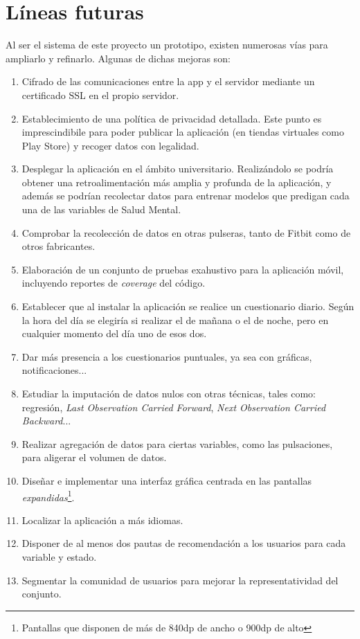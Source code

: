 \chapter{Líneas futuras}
\label{chapter:lineas}



Al ser el sistema de este proyecto un prototipo, existen numerosas vías para ampliarlo y refinarlo. Algunas de dichas
mejoras son:

\begin{enumerate}
    \item Cifrado de las comunicaciones entre la app y el servidor mediante un certificado SSL en el propio servidor.
    \item Establecimiento de una política de privacidad detallada. Este punto es imprescindibile para poder publicar la aplicación (en tiendas virtuales como Play Store) y recoger datos con legalidad.
    \item Desplegar la aplicación en el ámbito universitario. Realizándolo se podría obtener una retroalimentación más
    amplia y profunda de la aplicación, y además se podrían recolectar datos para entrenar
    modelos que predigan cada una de las variables de Salud Mental.
    \item Comprobar la recolección de datos en otras pulseras, tanto de Fitbit como de otros fabricantes.
    \item Elaboración de un conjunto de pruebas exahustivo para la aplicación móvil, incluyendo reportes de 
    \textit{coverage} del código.
    \item Establecer que al instalar la aplicación se realice un cuestionario diario. Según la hora del día se elegiría
    si realizar el de mañana o el de noche, pero en cualquier momento del día uno de esos dos.
    \item Dar más presencia a los cuestionarios puntuales, ya sea con gráficas, notificaciones...
    \item Estudiar la imputación de datos nulos con otras técnicas, tales como: regresión, \textit{Last Observation 
    Carried Forward}, \textit{Next Observation Carried Backward}... \cite{gupta_null_nodate}
    \item Realizar agregación de datos para ciertas variables, como las pulsaciones, para aligerar el volumen de datos.
    \item Diseñar e implementar una interfaz gráfica centrada en las pantallas \textit{expandidas}\footnote{Pantallas 
    que disponen de más de 840dp de ancho o 900dp de alto}.
    \item Localizar la aplicación a más idiomas.
    \item Disponer de al menos dos pautas de recomendación a los usuarios para cada variable y estado.
    \item Segmentar la comunidad de usuarios para mejorar la representatividad del conjunto.
\end{enumerate}

